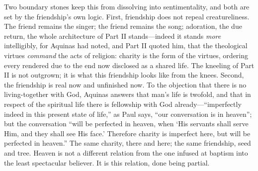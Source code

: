 Two boundary stones keep this from dissolving into sentimentality, and both are set by the friendship's own logic. First, friendship does not repeal creatureliness. The friend remains the singer; the friend remains the song; adoration, the due return, the whole architecture of Part II stands---indeed it stands \emph{more} intelligibly, for Aquinas had noted, and Part II quoted him, that the theological virtues \emph{command} the acts of religion: charity is the form of the virtues, ordering every rendered due to the end now disclosed as a shared life. The kneeling of Part II is not outgrown; it is what this friendship looks like from the knees. Second, the friendship is real now and unfinished now. To the objection that there is no living-together with God, Aquinas answers that man's life is twofold, and that in respect of the spiritual life there is fellowship with God already---``imperfectly indeed in this present state of life,'' as Paul says, ``our conversation is in heaven''; but the conversation ``will be perfected in heaven, when `His servants shall serve Him, and they shall see His face.' Therefore charity is imperfect here, but will be perfected in heaven.'' The same charity, there and here; the same friendship, seed and tree. Heaven is not a different relation from the one infused at baptism into the least spectacular believer. It is this relation, done being partial.

